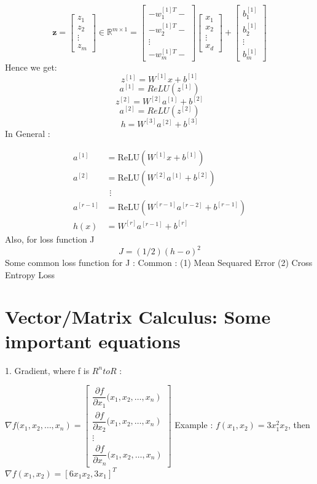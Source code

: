 \documentclass{article}
\begin{document}
\[
\mathbf{z} = \begin{bmatrix}
z_1 \\
z_2 \\
\vdots \\
z_m
\end{bmatrix} \in \mathbb{R}^{m \times 1} =
\begin{bmatrix}
-w^{[1]T}_1- \\
-w^{[1]T}_2- \\
\vdots \\
-w^{[1]T}_m-
\end{bmatrix}
\begin{bmatrix}
x_1 \\
x_2 \\
\vdots \\
x_d
\end{bmatrix}
+
\begin{bmatrix}
b^{[1]}_1 \\
b^{[1]}_2 \\
\vdots \\
b^{[1]}_m
\end{bmatrix}
\]
Hence we get: 
\[ z^{[1]}=W^{[1]}x+b^{[1]} \]
\[ a^{[1]} = ReLU(z^{[1]}) \]
\[ z^{[2]}=W^{[2]}a^{[1]}+b^{[2]} \]
\[ a^{[2]} = ReLU(z^{[2]}) \]
\[ h=W^{[3]}a^{[2]}+b^{[3]} \]
In General : 

\[
\begin{aligned}
a^{[1]} &= \text{ReLU}(W^{[1]}x + b^{[1]}) \\
a^{[2]} &= \text{ReLU}(W^{[2]}a^{[1]} + b^{[2]}) \\
&\ \, \vdots \\
a^{[r-1]} &= \text{ReLU}(W^{[r-1]}a^{[r-2]} + b^{[r-1]}) \\
h(x) &= W^{[r]}a^{[r-1]} + b^{[r]}
\end{aligned}
\]
Also, for loss function J
\[J = (1/2)(h-o)^2\]
Some common loss function for J : Common : (1) Mean Sequared Error (2) Cross Entropy Loss 


\section{Vector/Matrix Calculus: Some important equations}
1. Gradient, where f is \(R^n to R\) : \newline

 \( \nabla f(\left.x_{1}, x_{2}, \ldots, x_{n}\right)=\left[\begin{array}{c}
\dfrac{\partial f}{\partial x_1}(\left.x_{1}, x_{2}, \ldots, x_{n}\right)\\
\dfrac{\partial f}{\partial x_2}(\left.x_{1}, x_{2}, \ldots, x_{n}\right) \\
\vdots \\
\dfrac{\partial f}{\partial x_n}(\left.x_{1}, x_{2}, \ldots, x_{n}\right) 
\end{array}\right]\) \newline
Example : \(f(x_1,x_2) = 3x_1^2x_2\), then \( \nabla f(x_1,x_2) = [6x_1x_2,3x_1]^T \) \newline
\end{document}
